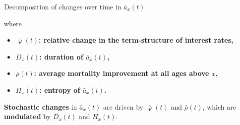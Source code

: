 \documentclass[10pt]{beamer}
\begin{document}
{
	\begin{frame}[standout]
\end{frame}
}



\begin{frame}{Decomposition of changes over time in $\bar{a}_x(t)$}

\begin{center}
	\pause
\end{center}

where

\begin{itemize}

	\item $\bar{\upvarphi}(t)$\textbf{: relative change in the term-structure of interest rates,} \pause
	\item ${D}_x(t)$\textbf{: duration of $\bar{a}_x(t)$,}	\pause
	\item $\bar{\rho}(t)$\textbf{: average mortality improvement at all ages above $x$,} \pause
	\item ${H}_x(t)$\textbf{: entropy of $\bar{a}_x(t)$.} \pause
\end{itemize}


\textbf{Stochastic changes} in $\bar{a}_x(t)$ are driven by $\bar{\upvarphi}(t)$ and $\bar{\rho}(t)$, which are \textbf{modulated} by  ${D}_x(t)$ and ${H}_x(t)$.
\end{frame}
\end{document}
